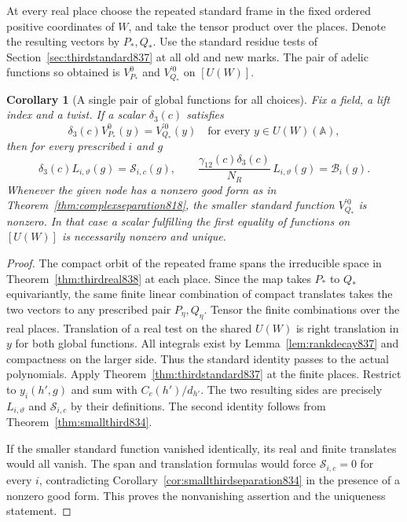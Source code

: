 \documentclass[a4paper,11pt]{article}
\newtheorem{corollary}[proposition]{Corollary}
\theoremstyle{definition}
\theoremstyle{remark}
\numberwithin{equation}{section}
\begin{document}
At every real place choose the repeated standard frame in
the fixed ordered positive coordinates of \(W\), and take
the tensor product over the places. Denote the resulting
vectors by \(P_*,Q_*\). Use the standard residue tests of
Section~\ref{sec:thirdstandard837} at all old and new marks.
The pair of adelic functions so obtained is \(V^0_{P_*}\) and
\(V^{\prime0}_{Q_*}\) on \([U(W)]\).

\begin{corollary}[A single pair of global functions for all choices]
\leavevmode\label{cor:thirdseed838}
Fix a field, a lift index and a twist. If a scalar
\(\delta_3(c)\) satisfies
\[
             \delta_3(c)V^0_{P_*}(y)=V^{\prime0}_{Q_*}(y)
               \quad\text{for every }y\in U(W)(\mathbb A),
\]
then for every prescribed \(i\) and \(g\)
\[
 \delta_3(c)L_{i,\vartheta}(g)=\mathcal S_{i,c}(g),\qquad
 \frac{\gamma_{12}(c)\delta_3(c)}{N_R}\,L_{i,\vartheta}(g)
                   =\mathcal B_i(g).
\]
Whenever the given node has a nonzero good form as in
Theorem~\ref{thm:complexseparation818}, the smaller standard
function \(V^{\prime0}_{Q_*}\) is nonzero. In that case a
scalar fulfilling the first equality of functions on \([U(W)]\)
is necessarily nonzero and unique.
\end{corollary}
\begin{proof}
The compact orbit of the repeated frame spans the irreducible
space in Theorem~\ref{thm:thirdreal838} at each place. Since
the map takes \(P_*\) to \(Q_*\) equivariantly, the same finite
linear combination of compact translates takes the two vectors
to any prescribed pair \(P_\eta,Q_\eta\). Tensor the finite
combinations over the real places. Translation of a real test
on the shared \(U(W)\) is right translation in \(y\) for
both global functions. All integrals exist by
Lemma~\ref{lem:rankdecay837} and compactness on the larger
side. Thus the standard identity passes to the actual
polynomials. Apply Theorem~\ref{thm:thirdstandard837} at
the finite places. Restrict to \(y_i(h',g)\) and sum with
\(C_c(h')/d_{h'}\). The two resulting sides are precisely
\(L_{i,\vartheta}\) and \(\mathcal S_{i,c}\) by their
definitions. The second identity follows from
Theorem~\ref{thm:smallthird834}.

If the smaller standard function vanished identically, its
real and finite translates would all vanish. The span and
translation formulas would force \(\mathcal S_{i,c}=0\)
for every \(i\), contradicting Corollary~\ref{cor:smallthirdseparation834}
in the presence of a nonzero good form. This proves the
nonvanishing assertion and the uniqueness statement.
\end{proof}
\end{document}
